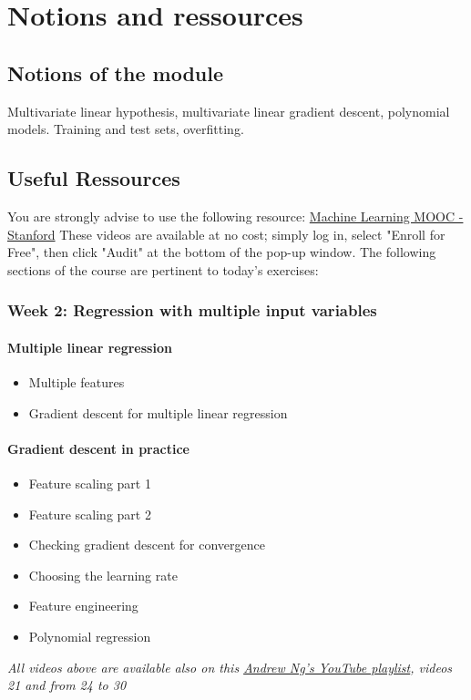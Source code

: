 

\chapter*{Notions and ressources}

\section*{Notions of the module}
Multivariate linear hypothesis, multivariate linear gradient descent, polynomial models. 
Training and test sets, overfitting.

\section*{Useful Ressources}

You are strongly advise to use the following resource:
\href{https://www.coursera.org/learn/machine-learning}{Machine Learning MOOC - Stanford}
These videos are available at no cost; simply log in, select "Enroll for Free", then click "Audit" at the bottom of the pop-up window.
The following sections of the course are pertinent to today's exercises: 

\subsection*{Week 2: Regression with multiple input variables}

\subsubsection*{Multiple linear regression}
\begin{itemize}
  \item Multiple features
  \item Gradient descent for multiple linear regression
\end{itemize}

\subsubsection*{Gradient descent in practice}
\begin{itemize}
  \item Feature scaling part 1
  \item Feature scaling part 2
  \item Checking gradient descent for convergence
  \item Choosing the learning rate
  \item Feature engineering
  \item Polynomial regression
\end{itemize}


\emph{All videos above are available also on this \href{https://youtube.com/playlist?list=PLkDaE6sCZn6FNC6YRfRQc_FbeQrF8BwGI&feature=shared}{Andrew Ng's YouTube playlist}, videos 21 and from 24 to 30}